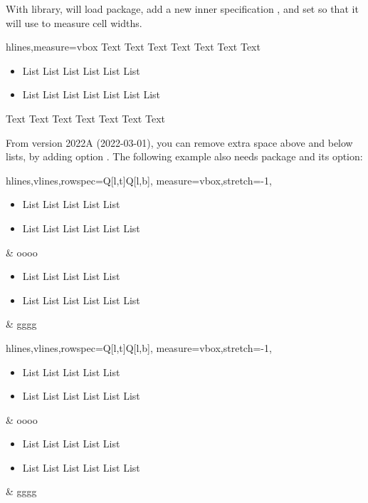 \documentclass[oneside]{book}
\begin{document}
With  library,  will load  package,
add a new inner specification , and set 
so that it will use \CC{\vbox} to measure cell widths.

\begin{demohigh}
\begin{tblr}{hlines,measure=vbox}
  Text Text Text Text Text Text Text
  \begin{itemize}
    \item List List List List List List
    \item List List List List List List List
  \end{itemize}
  Text Text Text Text Text Text Text \\
\end{tblr}
\end{demohigh}

From version 2022A (2022-03-01), you can remove extra space above and below lists,
by adding option .
The following example also needs  package and its  option:

{\centering\begin{tblr}{
  hlines,vlines,rowspec={Q[l,t]Q[l,b]},
  measure=vbox,stretch=-1,
}
  \begin{itemize}[nosep]
    \item List List List List List
    \item List List List List List List
  \end{itemize} & oooo \\
  \begin{itemize}[nosep]
    \item List List List List List
    \item List List List List List List
  \end{itemize} & gggg \\
\end{tblr}\par}

\begin{codehigh}
\begin{tblr}{
  hlines,vlines,rowspec={Q[l,t]Q[l,b]},
  measure=vbox,stretch=-1,
}
  \begin{itemize}[nosep]
    \item List List List List List
    \item List List List List List List
  \end{itemize} & oooo \\
  \begin{itemize}[nosep]
    \item List List List List List
    \item List List List List List List
  \end{itemize} & gggg \\
\end{tblr}
\end{codehigh}
\end{document}
